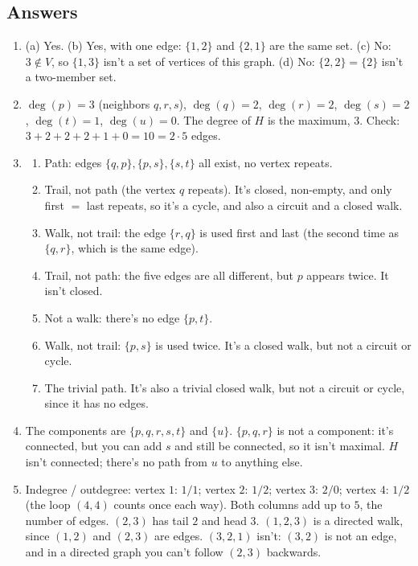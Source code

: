 \subsection{Answers}

\begin{enumerate}
\item (a) Yes. (b) Yes, with one edge: $\{1,2\}$ and $\{2,1\}$ are the same set. (c) No: $3\notin V$, so $\{1,3\}$ isn't a set of vertices of this graph. (d) No: $\{2,2\}=\{2\}$ isn't a two-member set.
\item $\deg(p)=3$ (neighbors $q,r,s$), $\deg(q)=2$, $\deg(r)=2$, $\deg(s)=2$, $\deg(t)=1$, $\deg(u)=0$. The degree of $H$ is the maximum, $3$. Check: $3+2+2+2+1+0=10=2\cdot 5$ edges.
\item \begin{enumerate}
\item Path: edges $\{q,p\},\{p,s\},\{s,t\}$ all exist, no vertex repeats.
\item Trail, not path (the vertex $q$ repeats). It's closed, non-empty, and only first $=$ last repeats, so it's a cycle, and also a circuit and a closed walk.
\item Walk, not trail: the edge $\{r,q\}$ is used first and last (the second time as $\{q,r\}$, which is the same edge).
\item Trail, not path: the five edges are all different, but $p$ appears twice. It isn't closed.
\item Not a walk: there's no edge $\{p,t\}$.
\item Walk, not trail: $\{p,s\}$ is used twice. It's a closed walk, but not a circuit or cycle.
\item The trivial path. It's also a trivial closed walk, but not a circuit or cycle, since it has no edges.
\end{enumerate}
\item The components are $\{p,q,r,s,t\}$ and $\{u\}$. $\{p,q,r\}$ is not a component: it's connected, but you can add $s$ and still be connected, so it isn't maximal. $H$ isn't connected; there's no path from $u$ to anything else.
\item Indegree / outdegree: vertex $1$: $1/1$; vertex $2$: $1/2$; vertex $3$: $2/0$; vertex $4$: $1/2$ (the loop $(4,4)$ counts once each way). Both columns add up to $5$, the number of edges. $(2,3)$ has tail $2$ and head $3$. $(1,2,3)$ is a directed walk, since $(1,2)$ and $(2,3)$ are edges. $(3,2,1)$ isn't: $(3,2)$ is not an edge, and in a directed graph you can't follow $(2,3)$ backwards.

\end{enumerate}
